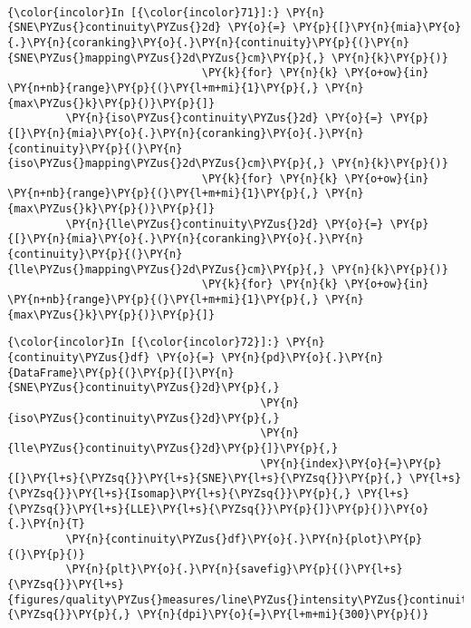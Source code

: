    \begin{center}
    \end{center}
    { \hspace*{\fill} \\}

    \begin{Verbatim}[commandchars=\\\{\}]
{\color{incolor}In [{\color{incolor}71}]:} \PY{n}{SNE\PYZus{}continuity\PYZus{}2d} \PY{o}{=} \PY{p}{[}\PY{n}{mia}\PY{o}{.}\PY{n}{coranking}\PY{o}{.}\PY{n}{continuity}\PY{p}{(}\PY{n}{SNE\PYZus{}mapping\PYZus{}2d\PYZus{}cm}\PY{p}{,} \PY{n}{k}\PY{p}{)}
                              \PY{k}{for} \PY{n}{k} \PY{o+ow}{in} \PY{n+nb}{range}\PY{p}{(}\PY{l+m+mi}{1}\PY{p}{,} \PY{n}{max\PYZus{}k}\PY{p}{)}\PY{p}{]}
         \PY{n}{iso\PYZus{}continuity\PYZus{}2d} \PY{o}{=} \PY{p}{[}\PY{n}{mia}\PY{o}{.}\PY{n}{coranking}\PY{o}{.}\PY{n}{continuity}\PY{p}{(}\PY{n}{iso\PYZus{}mapping\PYZus{}2d\PYZus{}cm}\PY{p}{,} \PY{n}{k}\PY{p}{)}
                              \PY{k}{for} \PY{n}{k} \PY{o+ow}{in} \PY{n+nb}{range}\PY{p}{(}\PY{l+m+mi}{1}\PY{p}{,} \PY{n}{max\PYZus{}k}\PY{p}{)}\PY{p}{]}
         \PY{n}{lle\PYZus{}continuity\PYZus{}2d} \PY{o}{=} \PY{p}{[}\PY{n}{mia}\PY{o}{.}\PY{n}{coranking}\PY{o}{.}\PY{n}{continuity}\PY{p}{(}\PY{n}{lle\PYZus{}mapping\PYZus{}2d\PYZus{}cm}\PY{p}{,} \PY{n}{k}\PY{p}{)}
                              \PY{k}{for} \PY{n}{k} \PY{o+ow}{in} \PY{n+nb}{range}\PY{p}{(}\PY{l+m+mi}{1}\PY{p}{,} \PY{n}{max\PYZus{}k}\PY{p}{)}\PY{p}{]}
\end{Verbatim}

    \begin{Verbatim}[commandchars=\\\{\}]
{\color{incolor}In [{\color{incolor}72}]:} \PY{n}{continuity\PYZus{}df} \PY{o}{=} \PY{n}{pd}\PY{o}{.}\PY{n}{DataFrame}\PY{p}{(}\PY{p}{[}\PY{n}{SNE\PYZus{}continuity\PYZus{}2d}\PY{p}{,}
                                       \PY{n}{iso\PYZus{}continuity\PYZus{}2d}\PY{p}{,}
                                       \PY{n}{lle\PYZus{}continuity\PYZus{}2d}\PY{p}{]}\PY{p}{,}
                                       \PY{n}{index}\PY{o}{=}\PY{p}{[}\PY{l+s}{\PYZsq{}}\PY{l+s}{SNE}\PY{l+s}{\PYZsq{}}\PY{p}{,} \PY{l+s}{\PYZsq{}}\PY{l+s}{Isomap}\PY{l+s}{\PYZsq{}}\PY{p}{,} \PY{l+s}{\PYZsq{}}\PY{l+s}{LLE}\PY{l+s}{\PYZsq{}}\PY{p}{]}\PY{p}{)}\PY{o}{.}\PY{n}{T}
         \PY{n}{continuity\PYZus{}df}\PY{o}{.}\PY{n}{plot}\PY{p}{(}\PY{p}{)}
         \PY{n}{plt}\PY{o}{.}\PY{n}{savefig}\PY{p}{(}\PY{l+s}{\PYZsq{}}\PY{l+s}{figures/quality\PYZus{}measures/line\PYZus{}intensity\PYZus{}continuity\PYZus{}2d.png}\PY{l+s}{\PYZsq{}}\PY{p}{,} \PY{n}{dpi}\PY{o}{=}\PY{l+m+mi}{300}\PY{p}{)}
\end{Verbatim}

